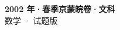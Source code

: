 \documentclass[zihao=-4, a4paper]{ctexart}
\begin{document}
\begin{center}
  {\Large\bfseries 2002 年·春季京蒙皖卷·文科}\\[4pt]
  {\large 数学 · 试题版}
\end{center}
\medskip
{}

\end{document}
